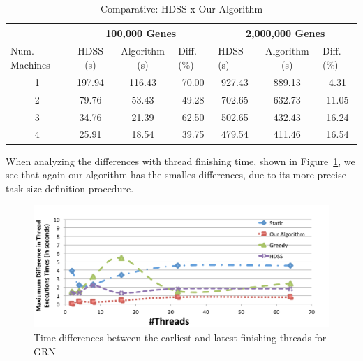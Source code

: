 \documentclass[journal]{IEEEtran}
\begin{document}
\begin{table}[htb]
\centering
\caption{Comparative: HDSS x Our Algorithm}

\begin{tabular}{c|c|c|c|c|c|c|}
\cline{2-7}
\multicolumn{1}{l|}{}                 & \multicolumn{3}{c|}{100,000 Genes}                              & \multicolumn{3}{c|}{2,000,000 Genes}                                                  \\ \hline
\multicolumn{1}{|l|}{Num. Machines} & HDSS (s) & Algorithm (s) & \multicolumn{1}{l|}{Diff. (\%)} & \multicolumn{1}{l|}{HDSS (s)} & Algorithm (s) & \multicolumn{1}{l|}{Diff. (\%)} \\ \hline
\multicolumn{1}{|c|}{1 }       &197.94     & 116.43              & 70.00                         & 927.43                         & 889.13              &           4.31                 \\ \hline
\multicolumn{1}{|c|}{2 }      & 79.76     & 53.43              & 49.28                            & 702.65                          & 632.73              & 11.05                           \\ \hline
\multicolumn{1}{|c|}{3 }      & 34.76     & 21.39              & 62.50                            & 502.65                          & 432.43             &               16.24                  \\ \hline
\multicolumn{1}{|c|}{4 }      & 25.91     & 18.54              & 39.75                            & 479.54                          & 411.46             &               16.54  \\ \hline
\end{tabular}
\label{table: gene}
\end{table}

When analyzing the differences with thread finishing time, shown in
Figure~\ref{fig:GeneDiferenca}, we see that again our algorithm has the smalles
differences, due to its more precise task size definition procedure.

\begin{figure}[htb]
	\begin{center}
	\centering
			\includegraphics[scale=0.33]{MaximoDiferenca_fabrizio_novo.pdf}
	\caption{Time differences between the earliest and latest finishing threads for GRN}
	\label{fig:GeneDiferenca}
	\end{center}
\end{figure}
\end{document}

